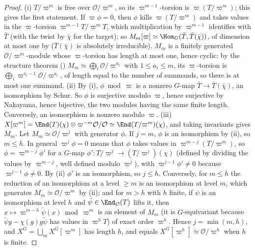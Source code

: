 \begin{proof}
(i) $T/\varpi^m$ is free over $\mathcal{O}/\varpi^m$, so its $\varpi^{m-1}$-torsion is $\varpi(T/\varpi^m)$; this gives the first statement. If $\varpi\phi=0$, then $\phi$ kills
$\varpi(T/\varpi^m)$ and takes values in the $\varpi$-torsion $\varpi^{m-1}T/\varpi^mT$, which multiplication by $\varpi^{m-1}$ identifies with $\bar T$ (with the twist by $\bar\chi$
for the target); so $M_m[\varpi]\simeq\Hom_G(\bar T,\bar T(\bar\chi))$, of dimension at most one by  ($\bar T(\bar\chi)$ is absolutely irreducible).
$M_m$ is a finitely generated $\mathcal{O}/\varpi^m$-module whose $\varpi$-torsion has length at most one, hence cyclic: by the structure
theorem () $M_m\simeq\bigoplus_i\mathcal{O}/\varpi^{a_i}$ with $1\le a_i\le m$, its $\varpi$-torsion is $\bigoplus_i\varpi^{a_i-1}\mathcal{O}/\varpi^{a_i}$, of length
equal to the number of summands, so there is at most one summand.
(ii) By (i), $\phi\bmod\varpi$ is a nonzero $G$-map $\bar T\to\bar T(\bar\chi)$, an isomorphism by Schur. So $\phi$ is surjective modulo $\varpi$, hence surjective by
Nakayama, hence bijective, the two modules having the same finite length. Conversely, an isomorphism is nonzero modulo $\varpi$.
(iii) $X[\varpi^m]=\End(T)(\chi)\otimes\varpi^{-m}\mathcal{O}/\mathcal{O}\simeq\End(T/\varpi^m)(\chi)$, and taking invariants gives $M_m$. Let $M_m\simeq\mathcal{O}/\varpi^j$ with generator $\phi$. If
$j=m$, $\phi$ is an isomorphism by (ii), so $m\le h$. In general $\varpi^j\phi=0$ means that $\phi$ takes values in $\varpi^{m-j}(T/\varpi^m)$, so $\phi=\varpi^{m-j}\phi'$ for a
$G$-map $\phi'\colon T/\varpi^j\to(T/\varpi^j)(\chi)$ (defined by dividing the values by $\varpi^{m-j}$, well defined modulo $\varpi^j$), with $\varpi^{j-1}\phi'\ne0$ because
$\varpi^{j-1}\phi\ne0$. By (ii) $\phi'$ is an isomorphism, so $j\le h$. Conversely, for $m\le h$ the reduction of an isomorphism at a level $\ge m$ is an
isomorphism at level $m$, which generates $M_m\simeq\mathcal{O}/\varpi^m$ by (ii); and for $m>h$ with $h$ finite, if $\psi$ is an isomorphism at level $h$ and $\tilde\psi\in\End_\mathcal{O}(T)$
lifts it, then $x\mapsto\varpi^{m-h}\tilde\psi(x)\bmod\varpi^m$ is an element of $M_m$ (it is $G$-equivariant because $\tilde\psi g-\chi(g)g\tilde\psi$ has values in
$\varpi^hT$) of exact order $\varpi^h$. Hence $j=\min(m,h)$, and $X^G=\bigcup_mX^G[\varpi^m]$ has length $h$, and equals $X^G[\varpi^h]\simeq\mathcal{O}/\varpi^h$ when $h$ is finite.


\end{proof}
